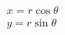 \documentclass[preview]{standalone}
\begin{document}
\begin{align*}
&x = r\cos\theta \\ &y = r\sin\theta
\end{align*}
\end{document}
